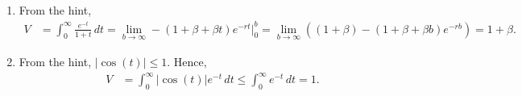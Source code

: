 \documentclass[11pt]{exam}
\begin{document}
\begin{questions}
\begin{solution}[0cm]
\begin{enumerate}[leftmargin = 0.5cm, label = (\alph*), rightmargin = 0.2cm]
        \item From the hint, 
        \begin{align*}
            V &= \int_0^\infty \frac{e^{-t}}{1+t} \, dt 
            = \lim_{b\rightarrow\infty} -\left( 1 + \beta + \beta t\right)e^{-rt}\Bigg|_0^b
            = \lim_{b\rightarrow\infty} \left((1 + \beta) - \left( 1 + \beta + \beta b\right)e^{-rb}\right) = 1 + \beta.
        \end{align*}

        \item From the hint, $|\cos(t)| \leq 1$. Hence,
        \begin{align*}
            V &= \int_0^\infty |\cos(t)|e^{-t} \, dt \leq \int_0^\infty e^{-t} \, dt = 1.
        \end{align*}
    \end{enumerate}
\end{solution}

\end{questions}	
\end{document}
